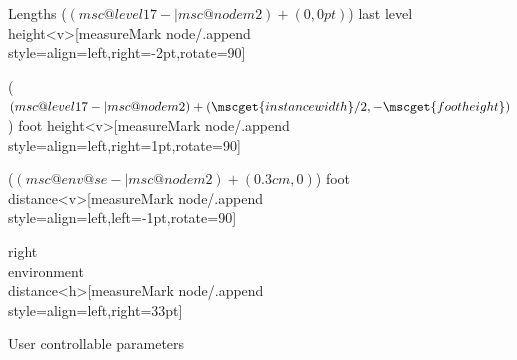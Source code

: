 \documentclass[12pt,a4paper]{article}
\begin{document}
\begin{figure}[htb]
\begin{msc}[right environment distance=2.3cm]{Lengths}
    {($(msc@level17-|msc@nodem2)+(0,0pt)$)}%
    {last level height}<v>[measureMark node/.append style={align=left,right=-2pt,rotate=90}]
  
    {($(msc@level17-|msc@nodem2)+(\mscget{instance width}/2,-\mscget{foot height})$)}%
    {foot height}<v>[measureMark node/.append style={align=left,right=1pt,rotate=90}]
  
    {($(msc@env@se-|msc@nodem2)+(0.3cm,0)$)}%
    {foot distance}<v>[measureMark node/.append style={align=left,left=-1pt,rotate=90}]
  
    {right\\ environment\\ distance}<h>[measureMark node/.append style={align=left,right=33pt}]
    
  \end{msc}
  
  \caption{User controllable parameters}
  \label{parametersfig}
\end{figure}
%
%
%
%
%
%
%
\end{document}
